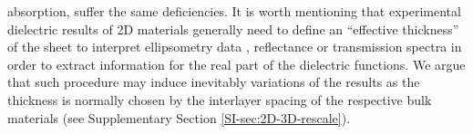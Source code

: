 \documentclass[journal=ancac3,manuscript=article,email=true,hyperref=true,keywords=false]{achemso}
\begin{document}
absorption, suffer the same deficiencies.
%
%
%
%
%
%
%
%
It is worth mentioning that experimental dielectric results of 2D
materials generally need to define an ``effective thickness'' of the sheet
to interpret ellipsometry data
\cite{graphene-epsilon10,Duesberg14,Chiang13,Kong14}, reflectance or
transmission spectra \cite{Li_2014, Yoffe-Wilson69} in order to
extract information for the real part of the dielectric functions.  We
argue that such procedure may induce inevitably variations of the
results as the thickness is normally chosen by the interlayer spacing
of the respective bulk materials (see Supplementary Section
\ref{SI-sec:2D-3D-rescale}).
%
%
%
%
%
\end{document}

